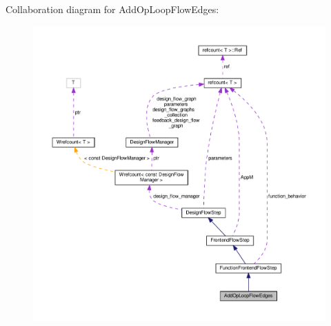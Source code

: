 Collaboration diagram for Add\+Op\+Loop\+Flow\+Edges\+:
\nopagebreak
\begin{figure}[H]
\begin{center}
\leavevmode
\includegraphics[width=350pt]{d7/dfe/classAddOpLoopFlowEdges__coll__graph}
\end{center}
\end{figure}
